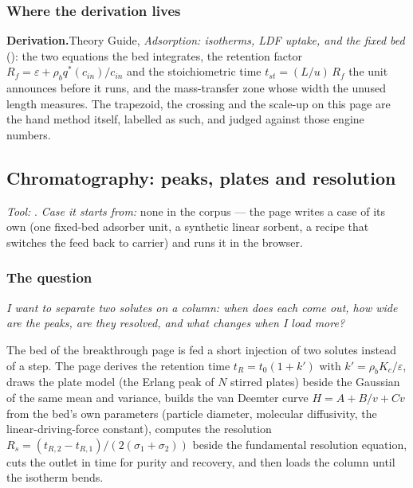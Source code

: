 \documentclass[11pt,a4paper]{article}
\newcommand{\derivation}[1]{%
  \smallskip\noindent\textbf{\sffamily\small Derivation.}\quad #1\par\smallskip}
\begin{document}
\subsubsection*{Where the derivation lives}

\derivation{Theory Guide, \emph{Adsorption: isotherms, LDF uptake, and the
fixed bed} (\theorydest{ch:adsorption}):
the two equations the bed integrates, the retention factor
$R_f = \varepsilon + \rho_b q^{*}(c_{in})/c_{in}$ and the stoichiometric
time $t_{st} = (L/u)\,R_f$ the unit announces before it runs, and the
mass-transfer zone whose width the unused length measures.  The trapezoid,
the crossing and the scale-up on this page are the hand method itself,
labelled as such, and judged against those engine numbers.}

\subsection{Chromatography: peaks, plates and resolution}\label{sec:edu-chromatography}


\noindent\textit{\small Tool:} .  \textit{\small
Case it starts from:} none in the corpus --- the page writes a
 case of its own (one fixed-bed adsorber unit, a synthetic
linear sorbent, a recipe that switches the feed back to carrier) and runs it
in the browser.

\subsubsection*{The question}

\emph{I want to separate two solutes on a column: when does each come out,
how wide are the peaks, are they resolved, and what changes when I load
more?}

The bed of the breakthrough page is fed a short injection of two solutes
instead of a step.  The page derives the retention time
$t_R = t_0(1+k')$ with $k' = \rho_b K_c/\varepsilon$, draws the plate model
(the Erlang peak of $N$ stirred plates) beside the Gaussian of the same
mean and variance, builds the van Deemter curve $H = A + B/v + Cv$ from the
bed's own parameters (particle diameter, molecular diffusivity, the
linear-driving-force constant), computes the resolution
$R_s = (t_{R,2}-t_{R,1})/(2(\sigma_1+\sigma_2))$ beside the fundamental
resolution equation, cuts the outlet in time for purity and recovery, and
then loads the column until the isotherm bends.
\end{document}

